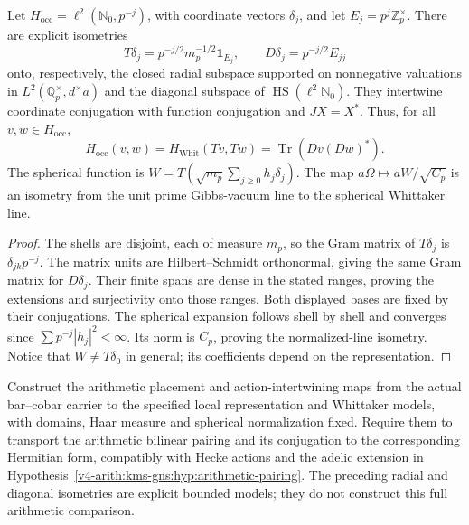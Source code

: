 \begin{theorem}
\label{v4-arith:bcglue-k5:thm:K5-absorption-canonical}
Let \(H_{\mathrm{occ}}=\ell^2(\mathbb N_0,p^{-j})\), with coordinate
vectors \(\delta_j\), and let \(E_j=p^j\mathbb Z_p^\times\).
There are explicit isometries
\[
 T\delta_j=p^{-j/2}m_p^{-1/2}\mathbf1_{E_j},\qquad
 D\delta_j=p^{-j/2}E_{jj}
\]
onto, respectively, the closed radial subspace supported on
nonnegative valuations in \(L^2(\mathbb Q_p^\times,d^\times a)\)
and the diagonal subspace of \(\operatorname{HS}(\ell^2\mathbb N_0)\).
They intertwine coordinate conjugation with function conjugation and
\(JX=X^*\). Thus, for all \(v,w\in H_{\mathrm{occ}}\),
\begin{equation}
\label{v4-arith:bcglue-k5:eq:K5-match}
 H_{\mathrm{occ}}(v,w)=H_{\mathrm{Whit}}(Tv,Tw)
 =\operatorname{Tr}(Dv(Dw)^*).
\end{equation}
The spherical function is
\(W=T(\sqrt{m_p}\sum_{j\ge0}h_j\delta_j)\).
The map \(a\Omega\mapsto aW/\sqrt{C_p}\) is an isometry from the
unit prime Gibbs-vacuum line to the spherical Whittaker line.
\end{theorem}
\begin{proof}
The shells are disjoint, each of measure \(m_p\), so the Gram
matrix of \(T\delta_j\) is \(\delta_{jk}p^{-j}\).
The matrix units are Hilbert--Schmidt orthonormal, giving the same
Gram matrix for \(D\delta_j\). Their finite spans are dense in the
stated ranges, proving the extensions and surjectivity onto those
ranges. Both displayed bases are fixed by their conjugations.
The spherical expansion follows shell by shell and converges since
\(\sum p^{-j}|h_j|^2<\infty\). Its norm is \(C_p\), proving the
normalized-line isometry. Notice that \(W\ne T\delta_0\) in
general; its coefficients depend on the representation.
\end{proof}

\begin{conjecture}
\label{v4-arith:bcglue-k5:conj:local-comparison-datum}
Construct the arithmetic placement and action-intertwining maps from
the actual bar--cobar carrier to the specified local representation
and Whittaker models, with domains, Haar measure and spherical
normalization fixed. Require them to transport the arithmetic
bilinear pairing and its conjugation to the corresponding Hermitian
form, compatibly with Hecke actions and the adelic extension in
Hypothesis~\ref{v4-arith:kms-gns:hyp:arithmetic-pairing}.
The preceding radial and diagonal isometries are explicit bounded
models; they do not construct this full arithmetic comparison.
\end{conjecture}

